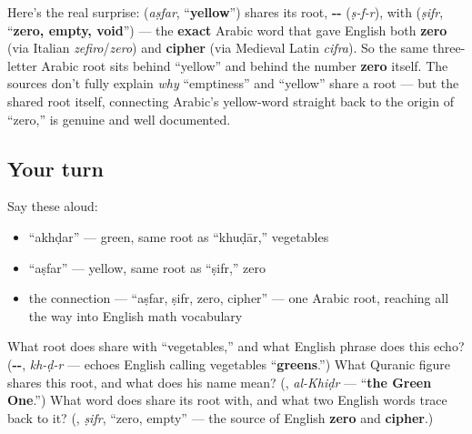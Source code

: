 \begin{culture}
Here's the real surprise: \textbf{} (\emph{aṣfar}, \textquotedblleft{}\textbf{yellow}\textquotedblright{}) shares its root, \textbf{--} (\emph{ṣ-f-r}), with \textbf{} (\emph{ṣifr}, \textquotedblleft{}\textbf{zero, empty, void}\textquotedblright{}) — the \textbf{exact} Arabic word that gave English both \textbf{zero} (via Italian \emph{zefiro}/\emph{zero}) and \textbf{cipher} (via Medieval Latin \emph{cifra}). So the same three-letter Arabic root sits behind \textquotedblleft{}yellow\textquotedblright{} and behind the number \textbf{zero} itself. The sources don't fully explain \emph{why} \textquotedblleft{}emptiness\textquotedblright{} and \textquotedblleft{}yellow\textquotedblright{} share a root — but the shared root itself, connecting Arabic's yellow-word straight back to the origin of \textquotedblleft{}zero,\textquotedblright{} is genuine and well documented.
\end{culture}

\subsection*{Your turn}
Say these aloud:

\begin{itemize}
\raggedright
  \item \textquotedblleft{}akhḍar\textquotedblright{} — green, same root as \textquotedblleft{}khuḍār,\textquotedblright{} vegetables
  \item \textquotedblleft{}aṣfar\textquotedblright{} — yellow, same root as \textquotedblleft{}ṣifr,\textquotedblright{} zero
  \item the connection — \textquotedblleft{}aṣfar, ṣifr, zero, cipher\textquotedblright{} — one Arabic root, reaching all the way into English math vocabulary
\end{itemize}

\begin{tcolorbox}[breakable,colback=teal!4,colframe=teal!35!black,title={Before you move on}]
What root does \textbf{} share with \textquotedblleft{}vegetables,\textquotedblright{} and what English phrase does this echo? (\textbf{--}, \emph{kh-ḍ-r} — echoes English calling vegetables \textquotedblleft{}\textbf{greens}.\textquotedblright{}) What Quranic figure shares this root, and what does his name mean? (\textbf{}, \emph{al-Khiḍr} — \textquotedblleft{}\textbf{the Green One}.\textquotedblright{}) What word does \textbf{} share its root with, and what two English words trace back to it? (\textbf{}, \emph{ṣifr}, \textquotedblleft{}zero, empty\textquotedblright{} — the source of English \textbf{zero} and \textbf{cipher}.)
\end{tcolorbox}
